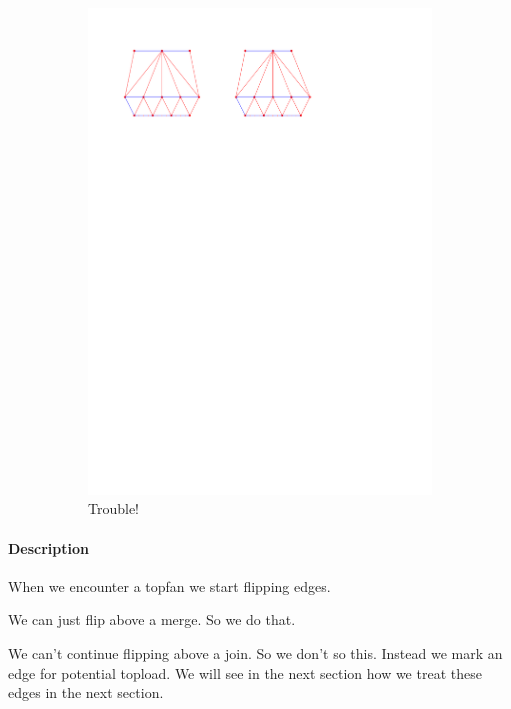 \begin{figure}
\begin{subfigure}[b]{0.45 \textwidth}
        \includegraphics[width =\textwidth]{topFanFlips/img/splitfront}
        \caption{Trouble!}
    \end{subfigure}

    \caption{}
    \label{fig:fanflip:fanflips}
\end{figure}


\paragraph{Description}
When we encounter a topfan we start flipping edges.

We can just flip above a merge. So we do that.

We can't continue flipping above a join. So we don't so this. Instead we mark an edge for potential topload. We will see in the next section how we treat these edges in the next section.


